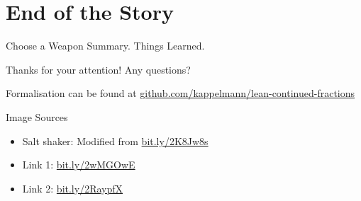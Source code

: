 \documentclass{beamer}
\begin{document}
\section{End of the Story}
\begin{frame}{Choose a Weapon}
Summary. Things Learned.
\end{frame}
\begin{frame}[standout]
\center
\Large{Thanks for your attention! Any questions?}

\vspace{20mm}
\normalsize{Formalisation can be found at \url{github.com/kappelmann/lean-continued-fractions}}
\end{frame}

\begin{frame}[allowframebreaks]{Image Sources}
\begin{itemize}
\item Salt shaker: Modified from \url{bit.ly/2K8Jw8s}
\item Link 1: \url{bit.ly/2wMGOwE}
\item Link 2: \url{bit.ly/2RaypfX}
\end{itemize}
\end{frame}
\end{document}
